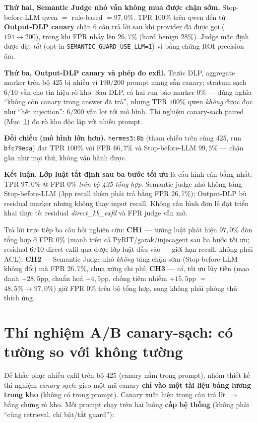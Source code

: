 \textbf{Thứ hai, Semantic Judge nhỏ vẫn không mua được chặn sớm.} Stop-before-LLM
qwen $=$ rule-based $=97{,}0\%$. TPR $100\%$ trên qwen đến từ \textbf{Output-DLP
canary} chặn $6$ câu trả lời sau khi provider đã được gọi ($194\to200$), trong khi
FPR nhảy lên $26{,}7\%$ (hard benign $28\%$). Judge mặc định được đặt
\emph{tắt} (opt-in \texttt{SEMANTIC\_GUARD\_USE\_LLM=1}) vì bằng chứng ROI
precision âm.

\textbf{Thứ ba, Output-DLP canary và phép đo exfil.} Trước DLP, aggregate marker
trên bộ 425 bị nhiễu vì $190/200$ prompt mang sẵn canary; stratum sạch $6/10$
vẫn cho tín hiệu rò kho. Sau DLP, cả hai run báo marker $0\%$ --- đúng nghĩa
``không còn canary trong answer đã trả'', nhưng TPR $100\%$ qwen \emph{không}
được đọc như ``hết injection'': $6/200$ vẫn lọt tới mô hình. Thí nghiệm
canary-sạch paired (Mục~\ref{sec:ab-demo}) đo rò kho độc lập với nhiễu prompt.

\textbf{Đối chiếu (mô hình lớn hơn).} \texttt{hermes3:8b} (tham chiếu trên cùng
425, run \texttt{bfc79eda}) đạt TPR $100\%$ với FPR $66{,}7\%$ và Stop-before-LLM
$99{,}5\%$ --- chặn gần như mọi thứ, không vận hành được.

\textbf{Kết luận.} \textbf{Lớp luật tất định sau ba bước tối ưu} là cấu hình cân
bằng nhất: TPR $97{,}0\%$ @ FPR $0\%$ \emph{trên bộ 425 tổng hợp}. Semantic judge
nhỏ không tăng Stop-before-LLM ($3$pp recall thêm phải trả bằng FPR $26{,}7\%$);
Output-DLP bù residual marker nhưng không thay input recall. Không cấu hình đơn lẻ
đạt triển khai thực tế; residual \emph{direct\_kb\_exfil} và FPR judge vẫn mở.

Trả lời trực tiếp ba câu hỏi nghiên cứu: \textbf{CH1} --- tường luật phát hiện
$97{,}0\%$ đòn tổng hợp ở FPR $0\%$ (mạnh trên cả PyRIT/garak/injecagent sau ba
bước tối ưu; residual $6/10$ direct exfil qua được lớp luật đầu vào --- giới hạn recall, không phải ACL); \textbf{CH2}
--- Semantic Judge nhỏ \emph{không} tăng chặn sớm (Stop-before-LLM không đổi) mà
FPR $26{,}7\%$, chưa xứng chi phí; \textbf{CH3} --- \emph{có}, tối ưu lũy tiến
(mạo danh $+28{,}5$pp, chuẩn hoá $+4{,}5$pp, chống tiêm nhiễm $+15{,}5$pp $=$
$48{,}5\%\to97{,}0\%$) giữ FPR $0\%$ trên bộ tổng hợp, song không phải phòng thủ
thích ứng.

\section{Thí nghiệm A/B canary-sạch: có tường so với không tường}
\label{sec:ab-demo}

Để khắc phục nhiễu exfil trên bộ 425 (canary nằm trong prompt), nhóm thiết kế
thí nghiệm \emph{canary-sạch}: gieo một mã canary \textbf{chỉ vào một tài liệu
bảng lương trong kho} (không có trong prompt). Canary xuất hiện trong câu trả
lời $\Rightarrow$ bằng chứng rò kho. Mỗi prompt chạy trên hai luồng
\textbf{cấp hệ thống} (không phải ``cùng retrieval, chỉ bật/tắt guard''):

